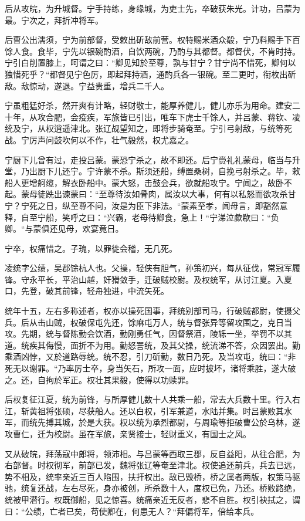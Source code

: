 \documentclass[12pt,UTF8]{ctexbook}
\begin{document}
后从攻皖，为升城督。宁手持练，身缘城，为吏士先，卒破获朱光。计功，吕蒙为最。宁次之，拜折冲将军。

后曹公出濡须，宁为前部督，受敕出斫敌前营。权特赐米酒众殽，宁乃料赐手下百馀人食。食毕，宁先以银碗酌酒，自饮两碗，乃酌与其都督。都督伏，不肯时持。宁引白削置膝上，呵谓之曰：“卿见知於至尊，孰与甘宁？甘宁尚不惜死，卿何以独惜死乎？“都督见宁色厉，即起拜持酒，通酌兵各一银碗。至二更时，衔枚出斫敌。敌惊动，遂退。宁益贵重，增兵二千人。

宁虽粗猛好杀，然开爽有计略，轻财敬士，能厚养健儿，健儿亦乐为用命。建安二十年，从攻合肥，会疫疾，军旅皆已引出，唯车下虎士千馀人，并吕蒙、蒋钦、凌统及宁，从权逍遥津北。张辽觇望知之，即将步骑奄至。宁引弓射敌，与统等死战。宁厉声问鼓吹何以不作，壮气毅然，权尤嘉之。

宁厨下儿曾有过，走投吕蒙。蒙恐宁杀之，故不即还。后宁赍礼礼蒙母，临当与升堂，乃出厨下儿还宁。宁许蒙不杀。斯须还船，缚置桑树，自挽弓射杀之。毕，敕船人更增舸缆，解衣卧船中。蒙大怒，击鼓会兵，欲就船攻宁。宁闻之，故卧不起。蒙母徒跣出谏蒙曰：“至尊待汝如骨肉，属汝以大事，何有以私怒而欲攻杀甘宁？宁死之日，纵至尊不问，汝是为臣下非法。“蒙素至孝，闻母言，即豁然意释，自至宁船，笑呼之曰：“兴霸，老母待卿食，急上！“宁涕泣歔欷曰：“负卿。“与蒙俱还见母，欢宴竟日。

宁卒，权痛惜之。子瑰，以罪徙会稽，无几死。

凌统字公绩，吴郡馀杭人也。父操，轻侠有胆气，孙策初兴，每从征伐，常冠军履锋。守永平长，平治山越，奸猾敛手，迁破贼校尉。及权统军，从讨江夏。入夏口，先登，破其前锋，轻舟独进，中流矢死。

统年十五，左右多称述者，权亦以操死国事，拜统别部司马，行破贼都尉，使摄父兵。后从击山贼，权破保屯先还，馀麻屯万人，统与督张异等留攻围之，克日当攻。先期，统与督陈勤会饮酒，勤刚勇任气，因督祭酒，陵轹一坐，举罚不以其道。统疾其侮慢，面折不为用。勤怒詈统，及其父操，统流涕不答，众因罢出。勤乘酒凶悖，又於道路辱统。统不忍，引刀斫勤，数日乃死。及当攻屯，统曰：“非死无以谢罪。“乃率厉士卒，身当矢石，所攻一面，应时披坏，诸将乘胜，遂大破之。还，自拘於军正。权壮其果毅，使得以功赎罪。

后权复征江夏，统为前锋，与所厚健儿数十人共乘一船，常去大兵数十里。行入右江，斩黄祖将张硕，尽获船人。还以白权，引军兼道，水陆并集。时吕蒙败其水军，而统先搏其城，於是大获。权以统为承烈都尉，与周瑜等拒破曹公於乌林，遂攻曹仁，迁为校尉。虽在军旅，亲贤接士，轻财重义，有国士之风。

又从破皖，拜荡寇中郎将，领沛相。与吕蒙等西取三郡，反自益阳，从往合肥，为右部督。时权彻军，前部已发，魏将张辽等奄至津北。权使追还前兵，兵去已远，势不相及，统率亲近三百人陷围，扶扞权出。敌已毁桥，桥之属者两版，权策马驱驰，统复还战，左右尽死，身亦被创，所杀数十人，度权已免，乃还。桥败路绝，统被甲潜行。权既御船，见之惊喜。统痛亲近无反者，悲不自胜。权引袂拭之，谓曰：“公绩，亡者已矣，苟使卿在，何患无人？“拜偏将军，倍给本兵。
\end{document}
